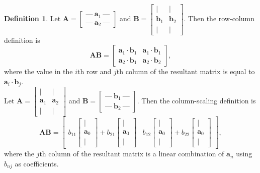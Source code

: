 \documentclass[11pt]{scrartcl}
\theoremstyle{plain}
\theoremstyle{definition}
\newtheorem*{definition}{Definition}
\theoremstyle{remark}
\begin{document}
\begin{definition}
    Let $\mathbf{A}=\begin{bmatrix}\text{---}\ \mathbf{a}_{1}\ \text{---} \\ \text{---}\ \mathbf{a}_{2}\ \text{---}
    \end{bmatrix}$ and $\mathbf{B}=\begin{bmatrix}| & | \\ \mathbf{b}_{1} & \mathbf{b}_{2} \\ | & |\end{bmatrix}$. 
    Then the row-column definition is
    \[ \mathbf{A}\mathbf{B}=\begin{bmatrix}\mathbf{a}_{1}\cdot \mathbf{b}_{1} & \mathbf{a}_{1}\cdot \mathbf{b}_{1} \\ 
    \mathbf{a}_{2}\cdot \mathbf{b}_{1} & \mathbf{a}_{2}\cdot \mathbf{b}_{2}\end{bmatrix},\]
    where the value in the $i$th row and $j$th column of the resultant matrix is equal to $\mathbf{a}_{i}\cdot 
    \mathbf{b}_{j}$. \\

    Let $\mathbf{A}=\begin{bmatrix}| & | \\ \mathbf{a}_{1} & \mathbf{a}_{2} \\ | & |\end{bmatrix}$ and $\mathbf{B}=
    \begin{bmatrix}\text{---}\ \mathbf{b}_{1}\ \text{---} \\ \text{---}\ \mathbf{b}_{2}\ \text{---}\end{bmatrix}$.
    Then the column-scaling definition is
    \[ \mathbf{A}\mathbf{B}=\begin{bmatrix}b_{11}\begin{bmatrix}| \\ \mathbf{a}_{0} \\ |\end{bmatrix}+b_{21}
    \begin{bmatrix}| \\ \mathbf{a}_{0} \\ |\end{bmatrix} & b_{12}\begin{bmatrix}| \\ \mathbf{a}_{0} \\ |\end{bmatrix}
    + b_{22}\begin{bmatrix}| \\ \mathbf{a}_{0} \\ |\end{bmatrix}\end{bmatrix}, \]
    where the $j$th column of the resultant matrix is a linear combination of $\mathbf{a}_{n}$ using $b_{nj}$ as 
    coefficients. \\[-0.75em] %
\end{definition} %
\end{document}
